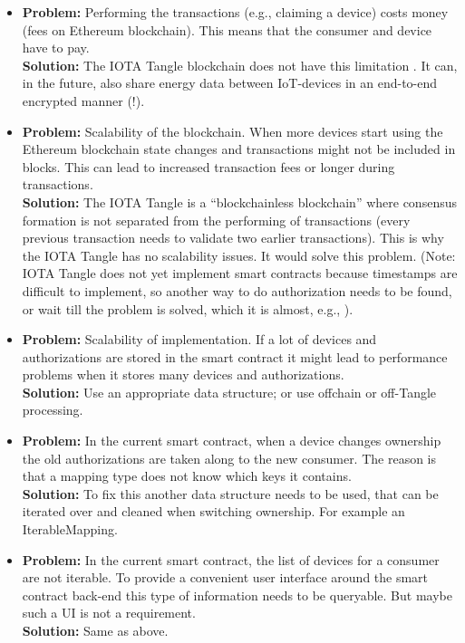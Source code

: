 \documentclass[paper=a4, fontsize=11pt]{scrartcl}
\numberwithin{equation}{section} %
\numberwithin{figure}{section}   %
\numberwithin{table}{section}    %
\begin{document}
\begin{itemize}
\item \textbf{Problem:} Performing the transactions (e.g., claiming a device)
  costs money (fees on Ethereum blockchain). This means that the consumer and
  device have to pay. \\\textbf{Solution:} The IOTA Tangle blockchain does not
  have this limitation \cite{iota}. It can, in the future, also share energy
  data between IoT-devices in an end-to-end encrypted manner \cite{iotamam} (!).
\item \textbf{Problem:} Scalability of the blockchain. When more devices start
  using the Ethereum blockchain state changes and transactions might not be
  included in blocks. This can lead to increased transaction fees or longer
  during transactions. \\\textbf{Solution:} The IOTA Tangle \cite{iota} is a
  ``blockchainless blockchain'' where consensus formation is not separated from
  the performing of transactions (every previous transaction needs to validate
  two earlier transactions). This is why the IOTA Tangle has no scalability
  issues. It would solve this problem. (Note: IOTA Tangle does not yet implement
  smart contracts because timestamps are difficult to implement, so another way
  to do authorization needs to be found, or wait till the problem is solved,
  which it is almost, e.g., \cite{iotatimestamps}).
\item \textbf{Problem:} Scalability of implementation. If a lot of devices and
  authorizations are stored in the smart contract it might lead to performance
  problems when it stores many devices and authorizations. \\\textbf{Solution:}
  Use an appropriate data structure; or use offchain or off-Tangle processing.
\item \textbf{Problem:} In the current smart contract, when a device changes
  ownership the old authorizations are taken along to the new consumer. The
  reason is that a mapping type does not know which keys it contains.
  \\\textbf{Solution:} To fix this another data structure needs to be used, that
  can be iterated over and cleaned when switching ownership. For example an
  IterableMapping.
\item \textbf{Problem:} In the current smart contract, the list of devices for a
  consumer are not iterable. To provide a convenient user interface around the
  smart contract back-end this type of information needs to be queryable. But
  maybe such a UI is not a requirement. \\\textbf{Solution:} Same as above.

\end{itemize}
\end{document}
